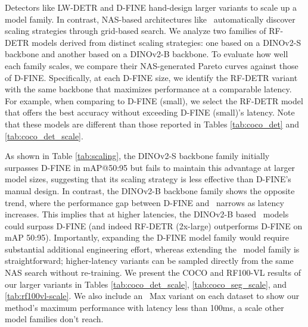 Detectors like LW-DETR \citep{chen2024lw} and D-FINE \citep{peng2024dfine} hand-design larger variants to scale up a model family. In contrast, NAS-based architectures like \method \ automatically discover scaling strategies through grid-based search. We analyze two families of RF-DETR models derived from distinct scaling strategies: one based on a DINOv2-S backbone and another based on a DINOv2-B backbone. To evaluate how well each family scales, we compare their NAS-generated Pareto curves against those of D-FINE. Specifically, at each D-FINE size, we identify the RF-DETR variant with the same backbone that maximizes performance at a comparable latency. For example, when comparing to D-FINE (small), we select the RF-DETR model that offers the best accuracy without exceeding D-FINE (small)'s latency. Note that these \method models are different than those reported in Tables \ref{tab:coco_det} and \ref{tab:coco_det_scale}.

As shown in Table \ref{tab:scaling}, the DINOv2-S backbone family initially surpasses D-FINE in mAP@50:95 but fails to maintain this advantage at larger model sizes, suggesting that its scaling strategy is less effective than D-FINE's manual design. In contrast, the DINOv2-B backbone family shows the opposite trend, where the performance gap between D-FINE and \method \ narrows as latency increases. This implies that at higher latencies, the DINOv2-B based \method \ models could surpass D-FINE (and indeed RF-DETR (2x-large) outperforms D-FINE on mAP 50:95). Importantly, expanding the D-FINE model family would require substantial additional engineering effort, whereas extending the \method \ model family is straightforward; higher-latency variants can be sampled directly from the same NAS search without re-training. We present the COCO and RF100-VL results of our larger variants in Tables \ref{tab:coco_det_scale}, \ref{tab:coco_seg_scale}, and \ref{tab:rf100vl-scale}. We also include an \method \ Max variant on each dataset to show our method's maximum performance with latency less than 100ms, a scale other model families don't reach.


